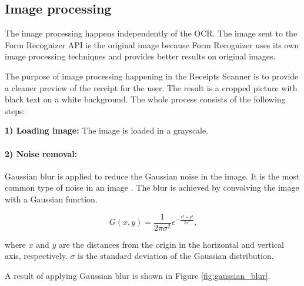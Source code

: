 \documentclass[
  digital, %
  table,   %
  oneside, %
  lof,     %
  lot,     %
]{fithesis3}
\begin{document}
\subsection{Image processing}
The image processing happens independently of the OCR. The image sent to the Form Recognizer API is the original image because Form Recognizer uses its own image processing techniques and provides better results on original images.

The purpose of image processing happening in the Receipts Scanner is to provide a cleaner preview of the receipt for the user. The result is a cropped picture with black text on a white background. The whole process consists of the following steps:

\textbf{1) Loading image:} The image is loaded in a grayscale.

\paragraph{2) Noise removal:} Gaussian blur is applied to reduce the Gaussian noise in the image. It is the most common type of noise in an image \cite{Shreya2019OCRCNN}. The blur is achieved by convolving the image with a Gaussian function.

\begin{equation}
G(x,y) = \frac{1}{2\pi\sigma^2}e^{-\frac{x^2+y^2}{2\sigma^2}}\text{,}
\end{equation}

where $x$ and $y$ are the distances from the origin in the horizontal and vertical axis, respectively. $\sigma$ is the standard deviation of the Gaussian distribution. \cite{Shreya2019OCRCNN}

A result of applying Gaussian blur is shown in Figure \ref{fig:gaussian_blur}.
\end{document}
